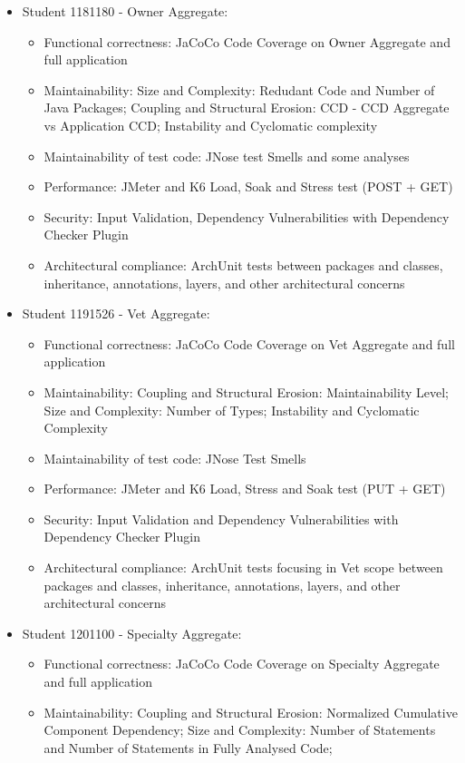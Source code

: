 \documentclass[a4paper,11pt,openright,BCOR=15mm]{scrbook}
\begin{document}
		\begin{itemize}
			\item Student 1181180 - Owner Aggregate: 
			\begin{itemize}
				\item Functional correctness: JaCoCo Code Coverage on Owner Aggregate and full application
				\item Maintainability: Size and Complexity: Redudant Code and Number of Java Packages; Coupling and Structural Erosion: CCD - CCD Aggregate vs Application CCD; Instability and Cyclomatic complexity
				\item Maintainability of test code: JNose test Smells and some analyses
				\item Performance: JMeter and K6 Load, Soak and Stress test (POST + GET)
				\item Security: Input Validation, Dependency Vulnerabilities with Dependency Checker Plugin
				\item Architectural compliance: ArchUnit tests between packages and classes, inheritance, annotations, layers, and other architectural concerns
			\end{itemize}
			\item Student 1191526 - Vet Aggregate: 
			\begin{itemize}
				\item Functional correctness: JaCoCo Code Coverage on Vet Aggregate and full application
				\item Maintainability: Coupling and Structural Erosion: Maintainability Level; Size and Complexity:	Number of Types; Instability and Cyclomatic Complexity
				\item Maintainability of test code: JNose Test Smells
				\item Performance: JMeter and K6 Load, Stress and Soak test (PUT + GET)
				\item Security: Input Validation and Dependency Vulnerabilities with Dependency Checker Plugin
				\item Architectural compliance: ArchUnit tests focusing in Vet scope between packages and classes, inheritance, annotations, layers, and other architectural concerns
			\end{itemize}	
			\item Student 1201100 - Specialty Aggregate: 
			\begin{itemize}
				\item Functional correctness: JaCoCo Code Coverage on Specialty Aggregate and full application
				\item Maintainability: Coupling and Structural Erosion: Normalized Cumulative Component Dependency; Size and Complexity: Number of Statements and Number of Statements in Fully Analysed Code;

\end{itemize}
\end{itemize}
\end{document}
